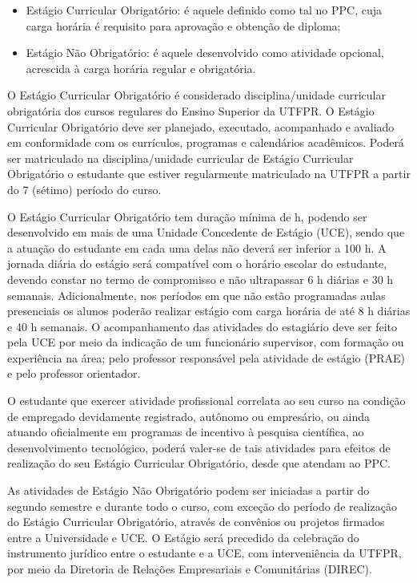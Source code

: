 \begin{itemize}
	\item Estágio Curricular Obrigatório: é aquele definido como tal no PPC, cuja carga horária é requisito para aprovação e obtenção de diploma;
	\item Estágio Não Obrigatório: é aquele desenvolvido como atividade opcional, acrescida à carga horária regular e obrigatória.
\end{itemize}

O Estágio Curricular Obrigatório é considerado disciplina/unidade curricular obrigatória dos cursos regulares do Ensino Superior da UTFPR. O Estágio Curricular Obrigatório deve ser planejado, executado, acompanhado e avaliado em conformidade com os currículos, programas e calendários acadêmicos. Poderá ser matriculado na disciplina/unidade curricular de Estágio Curricular Obrigatório o estudante que estiver regularmente matriculado na UTFPR a partir do 7\textordmasculine{} (sétimo) período do curso.

O Estágio Curricular Obrigatório tem duração mínima de  h, podendo ser desenvolvido em mais de uma Unidade Concedente de Estágio (UCE), sendo que a atuação do estudante em cada uma delas não deverá ser inferior a 100 h. A jornada diária do estágio será compatível com o horário escolar do estudante, devendo constar no termo de compromisso e não ultrapassar 6 h diárias e 30 h semanais. Adicionalmente, nos períodos em que não estão programadas aulas presenciais os alunos poderão realizar estágio com carga horária de até 8 h diárias e 40 h semanais. O acompanhamento das atividades do estagiário deve ser feito pela UCE por meio da indicação de um funcionário supervisor, com formação ou experiência na área; pelo professor responsável pela atividade de estágio (PRAE) e pelo professor orientador.

O estudante que exercer atividade profissional correlata ao seu curso na condição de empregado devidamente registrado, autônomo ou empresário, ou ainda atuando oficialmente em programas de incentivo à pesquisa científica, ao desenvolvimento tecnológico, poderá valer-se de tais atividades para efeitos de realização do seu Estágio Curricular Obrigatório, desde que atendam ao PPC.

As atividades de Estágio Não Obrigatório podem ser iniciadas a partir do segundo semestre e durante todo o curso, com exceção do período de realização do Estágio Curricular Obrigatório, através de convênios ou projetos firmados entre a Universidade e UCE. O Estágio será precedido da celebração do instrumento jurídico entre o estudante e a UCE, com interveniência da UTFPR, por meio da Diretoria de Relações Empresariais e Comunitárias (DIREC).


